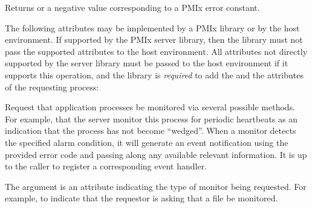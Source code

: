 \begin{arglist}
\end{arglist}

Returns  or a negative value corresponding to a PMIx error constant.

\optattrstart
The following attributes may be implemented by a \ac{PMIx} library or by the host environment. If supported by the \ac{PMIx} server library, then the library must not pass the supported attributes to the host environment. All attributes not directly supported by the server library must be passed to the host environment if it supports this operation, and the library is \textit{required} to add the  and the  attributes of the requesting process:


\optattrend

\descr

Request that application processes be monitored via several possible methods.
For example, that the server monitor this process for periodic heartbeats as an indication that the process has not become ``wedged''.
When a monitor detects the specified alarm condition, it will generate an event notification using the provided error code and passing along any available relevant information.
It is up to the caller to register a corresponding event handler.

The  argument is an attribute indicating the type of monitor being requested.
For example,  to indicate that the requestor is asking that a file be monitored.

